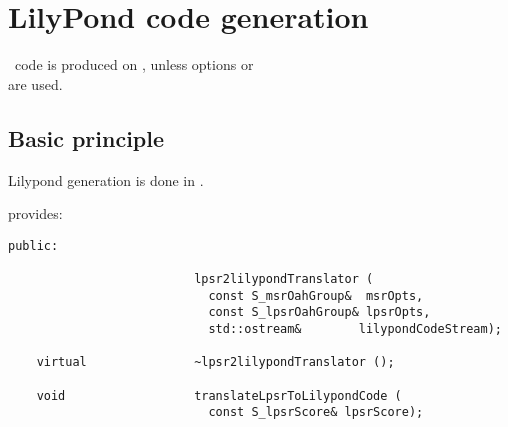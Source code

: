 



\chapter{LilyPond code generation}


\lily\ code is produced on \standardOutput, unless options  or \\
 are used.


\section{Basic principle}

Lilypond generation is done in .

 provides:
\begin{lstlisting}[language=CPlusPlus]
  public:

                          lpsr2lilypondTranslator (
                            const S_msrOahGroup&  msrOpts,
                            const S_lpsrOahGroup& lpsrOpts,
                            std::ostream&        lilypondCodeStream);

    virtual               ~lpsr2lilypondTranslator ();

    void                  translateLpsrToLilypondCode (
                            const S_lpsrScore& lpsrScore);
\end{lstlisting}

